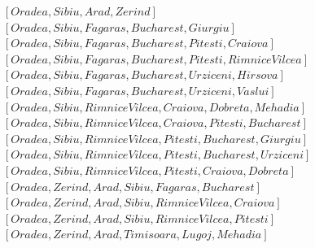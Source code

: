 \documentclass{article}%
\begin{document}
\begin{enumerate}
\begin{enumerate}
\begin{itemize}
\begin{itemize}
			$\left[ Oradea, Sibiu, Arad,Zerind \right]$ \\ 
			$ \left[ Oradea, Sibiu, Fagaras, Bucharest, Giurgiu \right]$ \\ 
			$\left[ Oradea, Sibiu, Fagaras, Bucharest, Pitesti, Craiova\right]$ \\ 
			$\left[ Oradea, Sibiu, Fagaras, Bucharest, Pitesti, Rimnice Vilcea\right]$ \\ 
			$ \left[ Oradea, Sibiu, Fagaras, Bucharest, Urziceni, Hirsova\right]$ \\
			$ \left[ Oradea, Sibiu, Fagaras, Bucharest, Urziceni, Vaslui\right]$ \\
			$ \left[ Oradea, Sibiu, Rimnice Vilcea, Craiova,Dobreta,Mehadia \right]$ \\ 
			$ \left[ Oradea, Sibiu, Rimnice Vilcea, Craiova,Pitesti, Bucharest \right]$ \\ 
			$\left[ Oradea, Sibiu, Rimnice Vilcea, Pitesti, Bucharest, Giurgiu \right] $ \\
			$\left[ Oradea, Sibiu, Rimnice Vilcea, Pitesti, Bucharest, Urziceni \right] $ \\
			$\left[ Oradea, Sibiu, Rimnice Vilcea, Pitesti, Craiova, Dobreta \right]$ \\
			$ \left[ Oradea, Zerind, Arad, Sibiu, Fagaras, Bucharest\right]$ \\ 
			$\left[ Oradea, Zerind, Arad, Sibiu, Rimnice Vilcea, Craiova\right]$ \\
			$\left[ Oradea, Zerind, Arad, Sibiu, Rimnice Vilcea, Pitesti\right]$ \\
			$\left[ Oradea, Zerind, Arad, Timisoara, Lugoj,Mehadia\right] $ 
			\end{itemize}
		\end{itemize}
	
	\end{enumerate}

\end{enumerate}
\end{document}
